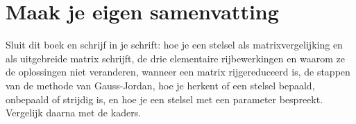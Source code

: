 
\ifzelfstudie
\section*{Maak je eigen samenvatting}
Sluit dit boek en schrijf in je schrift: hoe je een stelsel als matrixvergelijking en als uitgebreide matrix schrijft, de drie elementaire rijbewerkingen en waarom ze de oplossingen niet veranderen, wanneer een matrix rijgereduceerd is, de stappen van de methode van Gauss-Jordan, hoe je herkent of een stelsel bepaald, onbepaald of strijdig is, en hoe je een stelsel met een parameter bespreekt. Vergelijk daarna met de kaders.
\fi
